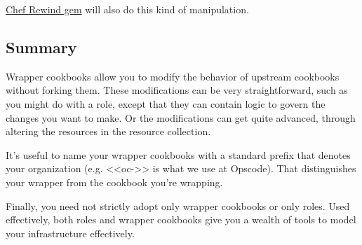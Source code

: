 \href{https://github.com/bryanwb/chef-rewind}{Chef Rewind gem} will also do this kind of manipulation.


\subsection{Summary}

Wrapper cookbooks allow you to modify the behavior of upstream cookbooks without forking them. These modifications can be very straightforward, such as you might do with a role, except that they can contain logic to govern the changes you want to make. Or the modifications can get quite advanced, through altering the resources in the resource collection.

It's useful to name your wrapper cookbooks with a standard prefix that denotes your organization (e.g. <<oc->> is what we use at Opscode). That distinguishes your wrapper from the cookbook you’re wrapping.

Finally, you need not strictly adopt only wrapper cookbooks or only roles. Used effectively, both roles and wrapper cookbooks give you a wealth of tools to model your infrastructure effectively.